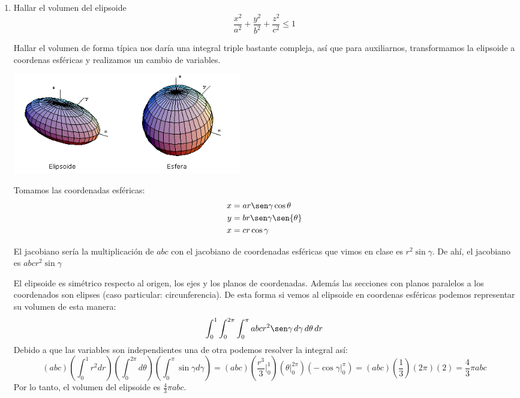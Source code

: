 \documentclass{article}
\begin{document}
\begin{enumerate}
        \item {
            Hallar el volumen del elipsoide
            \[
                \frac{x^2}{a^2}+\frac{y^2}{b^2}+\frac{z^2}{c^2}\leq 1
            \]

            \color{azul}
            Hallar el volumen de forma típica nos daría una integral triple
            bastante compleja, así que para auxiliarnos, transformamos la
            elipsoide a coordenas esféricas y realizamos un cambio de variables.
            \begin{center}
                \includegraphics[width=10cm]{img/elipsoide.png}
        	\end{center}
            Tomamos las coordenadas esféricas:
            \begin{align*}
                x &= ar\sen\gamma\cos{\theta}\\
                y &= br\sen\gamma\sen{\theta}\\
                x &= cr\cos\gamma
            \end{align*}

            El jacobiano sería la multiplicación de $abc$ con el jacobiano de
            coordenadas esféricas que vimos en clase es $r^2\sin\gamma$. De ahí,
            el jacobiano es $abcr^2\sin\gamma$

            El elipsoide es simétrico respecto al origen, los ejes y los planos
            de coordenadas. Además las secciones con planos paralelos a los
            coordenados son elipses (caso particular: circunferencia). De esta
            forma si vemos al elipsoide en coordenas esféricas podemos
            representar su volumen de esta manera:
        	\[
                \int_{0}^{1}{
                    \int_{0}^{2\pi}{
                        \int_{0}^{\pi}{
                            abcr^2\sen\gamma
                        \,d\gamma}
                    \,d\theta}
                \,dr}
            \]
            Debido a que las variables son independientes una de otra podemos
            resolver la integral así:
            \[
                (abc)
                \left(\int_{0}^{1}r^2 dr\right)
                \left(\int_{0}^{2\pi} d\theta\right)
                \left(\int_{0}^{\pi}\sin\gamma d\gamma\right)
                =
                (abc)
                \left(\frac{r^3}{3}\Big|_0^1\right)
                \left(\theta\Big|_0^{2\pi}\right)
                \left(-\cos{\gamma}\Big|_0^{\pi}\right)
                =
                (abc)\left(\frac{1}{3}\right)
                \left(2\pi\right)(2)
                =
                \frac{4}{3}\pi abc
            \]
            Por lo tanto, el volumen del elipsoide es
            $\displaystyle \frac{4}{3}\pi abc$.
        }


\end{enumerate}
\end{document}
